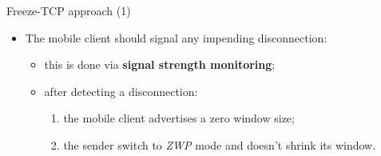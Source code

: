 \begin{frame}{Freeze-TCP approach (1)}
	\begin{itemize}
	  \item The mobile client should signal any impending disconnection:
	  \begin{itemize}
		\item this is done via \textbf{signal strength monitoring};
		\item after detecting a disconnection:
		   \begin{enumerate}
			\item the mobile client advertises a zero window size;
			\item the sender switch to \textit{ZWP} mode and
			      doesn't shrink its window.
		   \end{enumerate}
	  \end{itemize}
	\end{itemize}

\end{frame}
